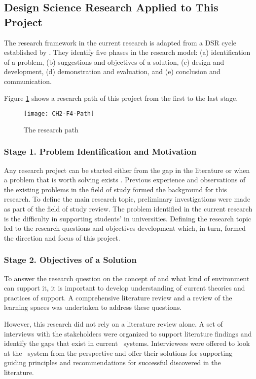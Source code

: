 \subsection{Design Science Research Applied to This Project}

The research framework in the current research is adapted from a DSR cycle
established by \citet{Vaishnavi2007}. They identify five phases in the research
model: (a) identification of a problem, (b) suggestions and objectives of a
solution, (c) design and development, (d) demonstration and evaluation, and (e)
conclusion and communication.

Figure \ref{fig:path} shows a research path of this project from the first
to the last stage.

\begin{figure}[htb]
\centering
\texttt{[image: CH2-F4-Path]}
\caption{The research path}
\label{fig:path}
\end{figure}

\subsubsection{Stage 1. Problem Identification and Motivation}

Any research project can be started either from the gap in the literature or
when a problem that is worth solving exists \citep{Bourner2002}. Previous
experience and observations of the existing problems in the field of study
formed the background for this research. To define the main research topic,
preliminary investigations were made as part of the field of study review. The
problem identified in the current research is the difficulty in supporting
students’ \LLLs in universities. Defining the research topic led to the research
questions and objectives development which, in turn, formed the direction and
focus of this project.

\subsubsection{Stage 2. Objectives of a Solution}

To answer the research question on the concept of \LLLs and what kind of
environment can support it, it is important to develop understanding of
current theories and practices of \LLLs support. A comprehensive literature
review and a review of the learning spaces was undertaken to address these
questions.

However, this research did not rely on a literature review alone. A set of
interviews with the stakeholders were organized to support literature findings
and identify the gaps that exist in current \ep~systems. Interviewees were
offered to look at the \ep~system from the \LLLs perspective and offer their
solutions for supporting guiding principles and recommendations for successful
\LLLs discovered in the literature.

